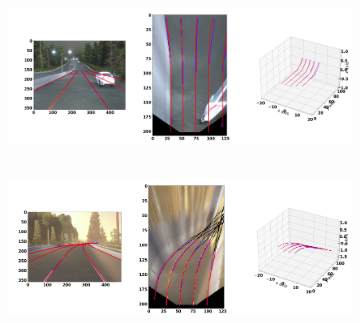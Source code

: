         \begin{figure}[h]
      \caption{Qualitative results of the trained GenLaneNet\cite{guo2020gen} trained with complex binary lane segmentation architecture on balanced scenes from sim3D\cite{guo2020gen} dataset: (a) uphill (b) downhill scenario}
        \centering
        \begin{subfigure}{0.6\textwidth}
        \includegraphics[width=1\linewidth, height=4cm]{images/uphill_standard.png} 
        \caption{  }
        \label{fig:subim1}
        \end{subfigure}
        \begin{subfigure}{0.6\textwidth}
        \includegraphics[width=1\linewidth,height=4cm]{images/downhill_standard.png}
        \caption{}
        \label{fig:subim2}
        \end{subfigure}
        \end{figure}


